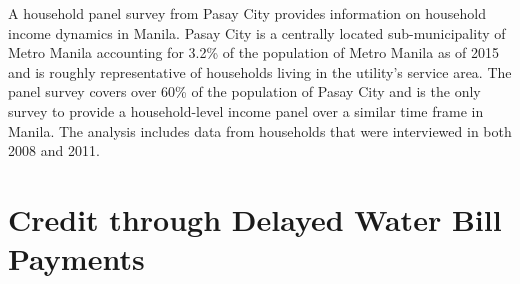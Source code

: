 \documentclass[12pt,table]{article}
\begin{document}
A household panel survey from Pasay City provides information on household income dynamics in Manila.  Pasay City is a centrally located sub-municipality of Metro Manila accounting for 3.2\% of the population of Metro Manila as of 2015 and is roughly representative of households living in the utility's service area.  The panel survey covers over 60\% of the population of Pasay City and is the only survey to provide a household-level income panel over a similar time frame in Manila.  The analysis includes data from households that were interviewed in both 2008 and 2011.









\section{Credit through Delayed Water Bill Payments}\label{section:descriptives}

\end{document}

